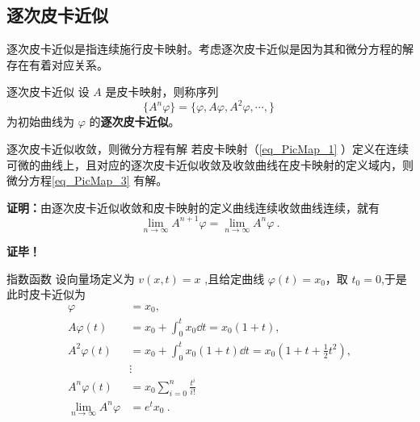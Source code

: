 \subsection{逐次皮卡近似}
逐次皮卡近似是指连续施行皮卡映射。考虑逐次皮卡近似是因为其和微分方程的解存在有着对应关系。
\begin{definition}{逐次皮卡近似}
设 $A$ 是皮卡映射，则称序列
\begin{equation}
\{A^n\varphi\}=\{\varphi, A\varphi, A^2\varphi,\cdots,\}~ 
\end{equation}
为初始曲线为 $\varphi$ 的\textbf{逐次皮卡近似}。
\end{definition}
\begin{theorem}{逐次皮卡近似收敛，则微分方程有解}
若皮卡映射（\autoref{eq_PicMap_1} ）定义在连续可微的曲线上，且对应的逐次皮卡近似收敛及收敛曲线在皮卡映射的定义域内，则微分方程\autoref{eq_PicMap_3} 有解。
\end{theorem}
\textbf{证明：}由逐次皮卡近似收敛和皮卡映射的定义曲线连续收敛曲线连续，就有
\begin{equation}
\lim_{n\rightarrow\infty}A^{n+1}\varphi=\lim_{n\rightarrow\infty}A^n\varphi~.
\end{equation}



\textbf{证毕！}
\begin{example}{指数函数}
设向量场定义为 $v(x,t)=x$ ,且给定曲线 $\varphi(t)=x_0$，取 $t_0=0$,于是此时皮卡近似为
\begin{equation}
\begin{aligned}
\varphi&=x_0,\\
A\varphi(t)&=x_0+\int_{0}^{t}x_0\dd t=x_0(1+t),\\
A^2\varphi(t)&=x_0+\int_{0}^{t}x_0(1+t)\dd t=x_0(1+t+\frac{1}{2}t^2),\\
&\vdots\\
A^n\varphi(t)&=x_0\sum_{i=0}^n\frac{t^i}{i!}\\
\lim_{n\rightarrow\infty}A^n\varphi&=e^tx_0
~.
\end{aligned}
\end{equation}

\end{example}
